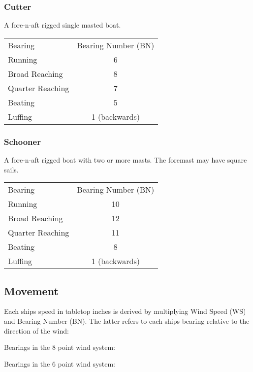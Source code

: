 \documentclass[11pt]{wbzine}
\begin{document}
\begin{multicols}{2}
\subsubsection{Cutter}

A fore-n-aft rigged single masted boat.


\begin{tabularx}{\columnwidth}{Zc}
Bearing & Bearing Number (BN) \\
Running & 6 \\
Broad Reaching & 8 \\
Quarter Reaching & 7 \\
Beating & 5 \\
Luffing & 1 (backwards) \\
\end{tabularx}

\subsubsection{Schooner}

A fore-n-aft rigged boat with two or more masts. The foremast may have
square sails.


\begin{tabularx}{\columnwidth}{Zc}
Bearing & Bearing Number (BN) \\
Running & 10 \\
Broad Reaching & 12 \\
Quarter Reaching & 11 \\
Beating & 8 \\
Luffing & 1 (backwards) \\
\end{tabularx}

\subsection{Movement}

Each ships speed in tabletop inches is derived by multiplying Wind Speed
(WS) and Bearing Number (BN). The latter refers to each ships bearing
relative to the direction of the wind:

Bearings in the 8 point wind system:


Bearings in the 6 point wind system:




\end{multicols}
\end{document}
